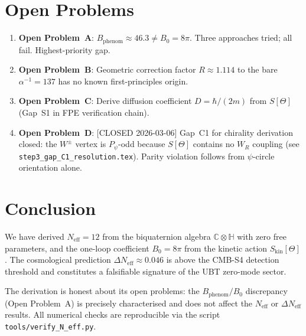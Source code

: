 \documentclass[12pt,a4paper]{article}
\theoremstyle{definition}
\theoremstyle{remark}
\newcommand{\C}{\mathbb{C}}
\renewcommand{\H}{\mathbb{H}}
\begin{document}
\section{Open Problems}
\label{sec:open_problems}

\begin{enumerate}
  \item \textbf{Open Problem~A}: $B_{\mathrm{phenom}} \approx 46.3 \neq B_0 = 8\pi$.
    Three approaches tried; all fail.  Highest-priority gap.

  \item \textbf{Open Problem~B}: Geometric correction factor $R \approx 1.114$
    to the bare $\alpha^{-1} = 137$ has no known first-principles origin.

  \item \textbf{Open Problem~C}: Derive diffusion coefficient $D = \hbar/(2m)$
    from $S[\Theta]$ (Gap~S1 in FPE verification chain).

  \item \textbf{Open Problem~D}: [CLOSED 2026-03-06]
    Gap~C1 for chirality derivation closed: the $W^\pm$ vertex is
    $P_\psi$-odd because $S[\Theta]$ contains no $W_R$ coupling
    (see \texttt{step3\_gap\_C1\_resolution.tex}).
    Parity violation follows from $\psi$-circle orientation alone.
\end{enumerate}

\section{Conclusion}
\label{sec:conclusion}

We have derived $N_{\mathrm{eff}} = 12$ from the biquaternion algebra
$\C\otimes\H$ with zero free parameters, and the one-loop coefficient
$B_0 = 8\pi$ from the kinetic action $S_{\mathrm{kin}}[\Theta]$.
The cosmological prediction $\Delta N_{\mathrm{eff}} \approx 0.046$
is above the CMB-S4 detection threshold and constitutes a falsifiable
signature of the UBT zero-mode sector.

The derivation is honest about its open problems: the
$B_{\mathrm{phenom}}/B_0$ discrepancy (Open Problem~A) is precisely
characterised and does not affect the $N_{\mathrm{eff}}$ or
$\Delta N_{\mathrm{eff}}$ results.  All numerical checks are reproducible
via the script \texttt{tools/verify\_N\_eff.py}.
\end{document}
